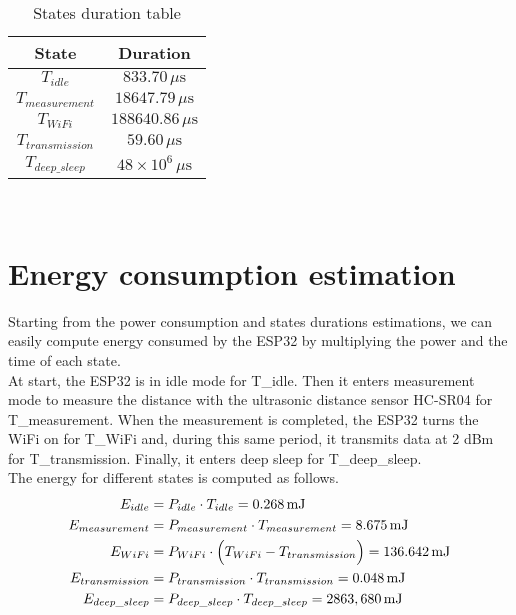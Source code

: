 \begin{table}[H]
\centering 
\begin{tabular}{| c | c |}
	\hline 
	\rowcolor{bluepoli!40}
	\textbf{State} & \textbf{Duration}\T\B \\
	\hline 
	$T_{idle}$ & $833.70\,\mu\text{s}$ \T\B\\
	$T_{measurement}$ & $18647.79\,\mu\text{s}$ \T\B\\
	$T_{WiFi}$ & $188640.86\,\mu\text{s}$ \T\B\\
	$T_{transmission}$ & $59.60\,\mu\text{s}$ \T\B\\
	$T_{deep\_sleep}$  & $48\times10^6\,\mu\text{s}$ \T\B\\
	\hline
\end{tabular}
\\[10pt]
\caption{States duration table}
\label{table:states_duration_table}
\end{table}

\section{Energy consumption estimation}
Starting from the power consumption and states durations estimations, we can easily compute energy consumed by the ESP32 by multiplying the power and the time of each state.\\
At start, the ESP32 is in idle mode for T\_{idle}. Then it enters measurement mode to measure the distance with the ultrasonic distance sensor HC-SR04 for T\_{measurement}. When the measurement is completed, the ESP32 turns the WiFi on for T\_{WiFi} and, during this same period, it transmits data at 2 dBm for T\_{transmission}. Finally, it enters deep sleep for T\_{deep\_sleep}. \\

The energy for different states is computed as follows.
\begin{align*}
	E_{idle} &= P_{idle} \cdot T_{idle} = 0.268 \,\text{mJ} \\ 
	E_{measurement} &= P_{measurement} \cdot T_{measurement} = 8.675 \,\text{mJ} \\
	E_{WiFi} &= P_{WiFi} \cdot \Bigl(T_{WiFi} - T_{transmission} \Bigr) = 136.642\,\text{mJ} \\
	E_{transmission} &= P_{transmission} \cdot T_{transmission} = 0.048\,\text{mJ} \\
   	E_{deep\_sleep} &= P_{deep\_sleep} \cdot T_{deep\_sleep} = 2863,680\,\text{mJ} 
\end{align*}

